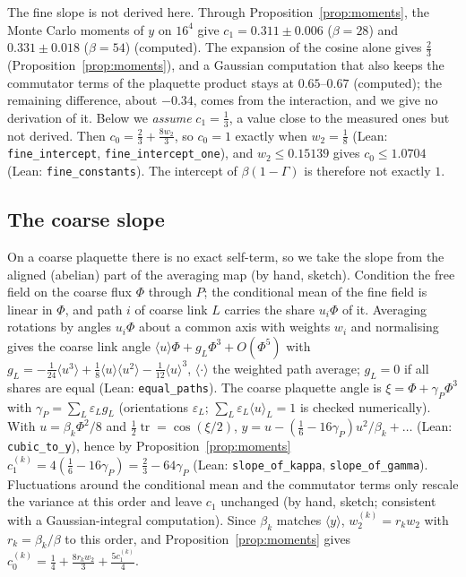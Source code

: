 \documentclass[11pt,a4paper]{article}
\theoremstyle{definition}
\theoremstyle{remark}
\newcommand{\code}[1]{\texttt{#1}}
\begin{document}
The fine slope is not derived here. Through Proposition~\ref{prop:moments}, the Monte Carlo moments of $y$ on $16^4$ give $c_1=0.311\pm0.006$ ($\beta=28$) and $0.331\pm0.018$ ($\beta=54$) (computed). The expansion of the cosine alone gives $\frac23$ (Proposition~\ref{prop:moments}), and a Gaussian computation that also keeps the commutator terms of the plaquette product stays at $0.65$--$0.67$ (computed); the remaining difference, about $-0.34$, comes from the interaction, and we give no derivation of it. Below we \emph{assume} $c_1=\frac13$, a value close to the measured ones but not derived. Then $c_0=\frac23+\frac{8w_2}3$, so $c_0=1$ exactly when $w_2=\frac18$ (Lean: \code{fine\_intercept}, \code{fine\_intercept\_one}), and $w_2\le0.15139$ gives $c_0\le1.0704$ (Lean: \code{fine\_constants}). The intercept of $\beta(1-\Gamma)$ is therefore not exactly $1$.

\subsection{The coarse slope}

On a coarse plaquette there is no exact self-term, so we take the slope from the aligned (abelian) part of the averaging map (by hand, sketch). Condition the free field on the coarse flux $\Phi$ through $P$; the conditional mean of the fine field is linear in $\Phi$, and path $i$ of coarse link $L$ carries the share $u_i\Phi$ of it. Averaging rotations by angles $u_i\Phi$ about a common axis with weights $w_i$ and normalising gives the coarse link angle $\langle u\rangle\Phi+g_L\Phi^3+O(\Phi^5)$ with $g_L=-\frac1{24}\langle u^3\rangle+\frac18\langle u\rangle\langle u^2\rangle-\frac1{12}\langle u\rangle^3$, $\langle\cdot\rangle$ the weighted path average; $g_L=0$ if all shares are equal (Lean: \code{equal\_paths}). The coarse plaquette angle is $\xi=\Phi+\gamma_P\Phi^3$ with $\gamma_P=\sum_L\varepsilon_Lg_L$ (orientations $\varepsilon_L$; $\sum_L\varepsilon_L\langle u\rangle_L=1$ is checked numerically). With $u=\beta_k\Phi^2/8$ and $\frac12\operatorname{tr}=\cos(\xi/2)$, $y=u-(\frac16-16\gamma_P)u^2/\beta_k+\dots$ (Lean: \code{cubic\_to\_y}), hence by Proposition~\ref{prop:moments} $c_1^{(k)}=4(\frac16-16\gamma_P)=\frac23-64\gamma_P$ (Lean: \code{slope\_of\_kappa}, \code{slope\_of\_gamma}).
Fluctuations around the conditional mean and the commutator terms only rescale the variance at this order and leave $c_1$ unchanged (by hand, sketch; consistent with a Gaussian-integral computation). Since $\beta_k$ matches $\langle y\rangle$, $w_2^{(k)}=r_kw_2$ with $r_k=\beta_k/\beta$ to this order, and Proposition~\ref{prop:moments} gives $c_0^{(k)}=\frac14+\frac{8r_kw_2}3+\frac{5c_1^{(k)}}4$.
\end{document}
